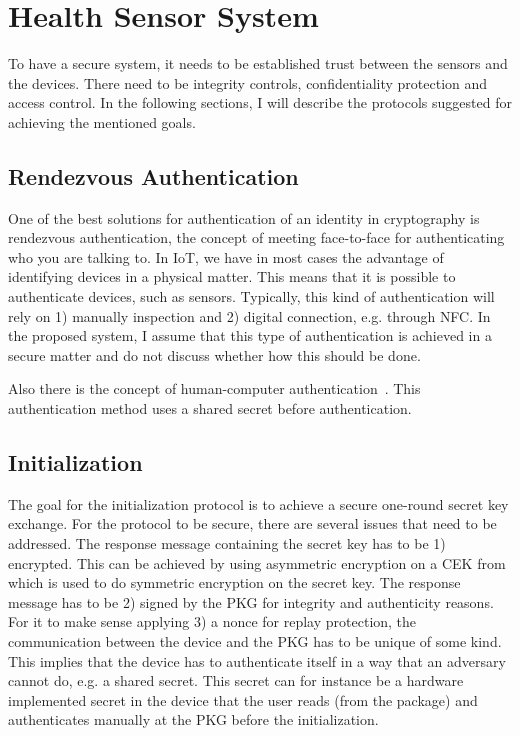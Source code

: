 \section{Health Sensor System}\label{hss}
To have a secure system, it needs to be established trust between the sensors and the devices.
There need to be integrity controls, confidentiality protection and access control. 
In the following sections, I will describe the protocols suggested for achieving the mentioned goals.

\subsection{Rendezvous Authentication}\label{rendezvous_authentication}
One of the best solutions for authentication of an identity in cryptography is rendezvous authentication, the concept of meeting face-to-face for authenticating who you are talking to. 
In \gls{IoT}, we have in most cases the advantage of identifying devices in a physical matter.
This means that it is possible to authenticate devices, such as sensors. 
Typically, this kind of authentication will rely on 1) manually inspection and 2) digital connection, e.g. through \gls{NFC}.
In the proposed system, I assume that this type of authentication is achieved in a secure matter and do not discuss whether how this should be done.

Also there is the concept of human-computer authentication~\cite{DBLP:journals/iacr/GilbertRS05, DBLP:conf/crypto/JuelsW05, DBLP:conf/percom/Weis05}.
This authentication method uses a shared secret before authentication. 

\subsection{Initialization}\label{init}
The goal for the initialization protocol is to achieve a secure one-round secret key exchange.
For the protocol to be secure, there are several issues that need to be addressed. 
The response message containing the secret key has to be 1) encrypted. 
This can be achieved by using asymmetric encryption on a \gls{CEK} from which is used to do symmetric encryption on the secret key.
The response message has to be 2) signed by the \gls{PKG} for integrity and authenticity reasons.
For it to make sense applying 3) a nonce for replay protection, the communication between the device and the \gls{PKG} has to be unique of some kind.
This implies that the device has to authenticate itself in a way that an adversary cannot do, e.g. a shared secret.
This secret can for instance be a hardware implemented secret in the device that the user reads (from the package) and authenticates manually at the \gls{PKG} before the initialization.

